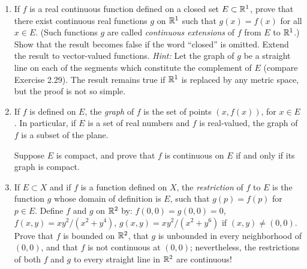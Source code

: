 \begin{enumerate}[label=\textbf{4.\arabic*.}, leftmargin=3.0em, itemsep=9pt,
                  topsep=8pt, labelsep=0.5em]
\item If $f$ is a real continuous function defined on a closed set
$E \subset \mathbb{R}^1$, prove that there exist continuous real functions $g$ on
$\mathbb{R}^1$ such that $g(x) = f(x)$ for all $x \in E$. (Such functions $g$ are
called \emph{continuous extensions} of $f$ from $E$ to $\mathbb{R}^1$.) Show that
the result becomes false if the word ``closed'' is omitted. Extend the
result to vector-valued functions. \emph{Hint:} Let the graph of $g$ be a
straight line on each of the segments which constitute the complement of $E$
(compare Exercise 2.29). The result remains true if $\mathbb{R}^1$ is replaced by
any metric space, but the proof is not so simple.

\item If $f$ is defined on $E$, the \emph{graph} of $f$ is the set of points
$(x,f(x))$, for $x \in E$. In particular, if $E$ is a set of real numbers
and $f$ is real-valued, the graph of $f$ is a subset of the plane.

Suppose $E$ is compact, and prove that $f$ is continuous on $E$ if and only
if its graph is compact.

\item If $E \subset X$ and if $f$ is a function defined on $X$, the
\emph{restriction} of $f$ to $E$ is the function $g$ whose domain of
definition is $E$, such that $g(p) = f(p)$ for $p \in E$. Define $f$ and $g$
on $\mathbb{R}^2$ by: $f(0,0) = g(0,0) = 0$, $f(x,y) = xy^2/(x^2+y^4)$,
$g(x,y) = xy^2/(x^2+y^6)$ if $(x,y) \ne (0,0)$. Prove that $f$ is bounded on
$\mathbb{R}^2$, that $g$ is unbounded in every neighborhood of $(0,0)$, and that $f$
is not continuous at $(0,0)$; nevertheless, the restrictions of both $f$ and
$g$ to every straight line in $\mathbb{R}^2$ are continuous!


\end{enumerate}
